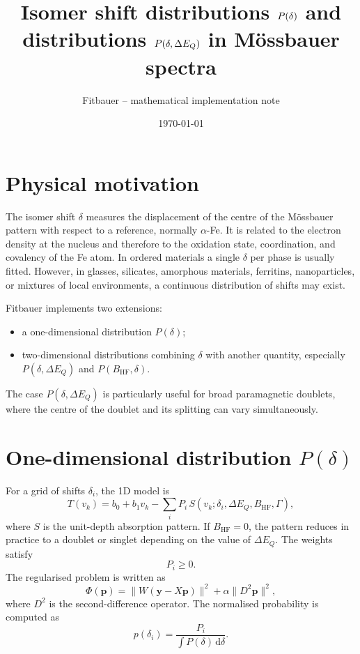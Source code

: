 \documentclass[11pt,a4paper]{article}
\title{Isomer shift distributions $P(\IS)$ and distributions $P(\IS,\QS)$ in M\"{o}ssbauer spectra}
\author{Fitbauer -- mathematical implementation note}
\date{\today}
\newcommand{\IS}{\delta}
\newcommand{\QS}{\Delta E_Q}
\newcommand{\BHF}{B_{\mathrm{HF}}}
\newcommand{\dd}{\mathrm{d}}
\begin{document}
\maketitle

\section{Physical motivation}

The isomer shift $\IS$ measures the displacement of the centre of the
M\"{o}ssbauer pattern with respect to a reference, normally $\alpha$-Fe. It is
related to the electron density at the nucleus and therefore to the oxidation
state, coordination, and covalency of the Fe atom. In ordered materials a single
$\IS$ per phase is usually fitted. However, in glasses, silicates, amorphous
materials, ferritins, nanoparticles, or mixtures of local environments, a
continuous distribution of shifts may exist.

Fitbauer implements two extensions:
\begin{itemize}
  \item a one-dimensional distribution $P(\IS)$;
  \item two-dimensional distributions combining $\IS$ with another quantity,
  especially $P(\IS,\QS)$ and $P(\BHF,\IS)$.
\end{itemize}
The case $P(\IS,\QS)$ is particularly useful for broad paramagnetic doublets,
where the centre of the doublet and its splitting can vary simultaneously.

\section{One-dimensional distribution $P(\IS)$}

For a grid of shifts $\IS_i$, the 1D model is
\begin{equation}
  T(v_k)=b_0+b_1v_k-\sum_i P_i\,S(v_k;\IS_i,\QS,\BHF,\Gamma),
\end{equation}
where $S$ is the unit-depth absorption pattern. If $\BHF=0$, the pattern reduces
in practice to a doublet or singlet depending on the value of $\QS$.
The weights satisfy
\begin{equation}
  P_i\ge0.
\end{equation}
The regularised problem is written as
\begin{equation}
  \Phi(\bm p)=\|W(\bm y-X\bm p)\|^2+\alpha\|D^2\bm p\|^2,
\end{equation}
where $D^2$ is the second-difference operator. The normalised probability is
computed as
\begin{equation}
  p(\IS_i)=\frac{P_i}{\int P(\IS)\,\dd\IS}.
\end{equation}
\end{document}
